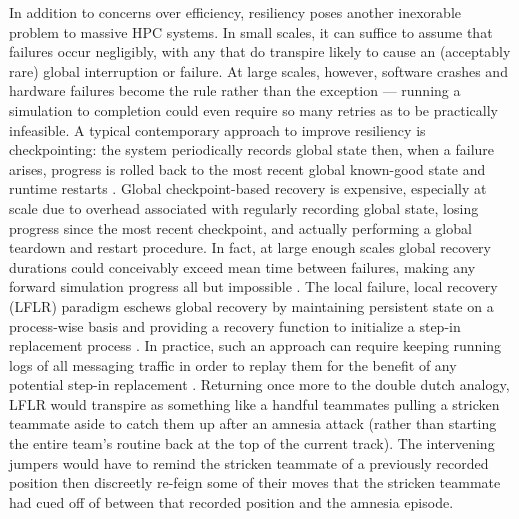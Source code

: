 In addition to concerns over efficiency, resiliency poses another inexorable problem to massive HPC systems.
In small scales, it can suffice to assume that failures occur negligibly, with any that do transpire likely to cause an (acceptably rare) global interruption or failure.
At large scales, however, software crashes and hardware failures become the rule rather than the exception \citep{dongarra2014applied} --- running a simulation to completion could even require so many retries as to be practically infeasible.
A typical contemporary approach to improve resiliency is checkpointing: the system periodically records global state then, when a failure arises, progress is rolled back to the most recent global known-good state and runtime restarts \citep{hursey2007design}.
Global checkpoint-based recovery is expensive, especially at scale due to overhead associated with regularly recording global state, losing progress since the most recent checkpoint, and actually performing a global teardown and restart procedure.
In fact, at large enough scales global recovery durations could conceivably exceed mean time between failures, making any forward simulation progress all but impossible \citep{dongarra2014applied}.
The local failure, local recovery (LFLR) paradigm eschews global recovery by maintaining persistent state on a process-wise basis and providing a recovery function to initialize a step-in replacement process \citep{heroux2014toward,teranishi2014toward}.
In practice, such an approach can require keeping running logs of all messaging traffic in order to replay them for the benefit of any potential step-in replacement \citep{chakravorty2004fault}.
Returning once more to the double dutch analogy, LFLR would transpire as something like a handful teammates pulling a stricken teammate aside to catch them up after an amnesia attack (rather than starting the entire team's routine back at the top of the current track).
The intervening jumpers would have to remind the stricken teammate of a previously recorded position then discreetly re-feign some of their moves that the stricken teammate had cued off of between that recorded position and the amnesia episode.

